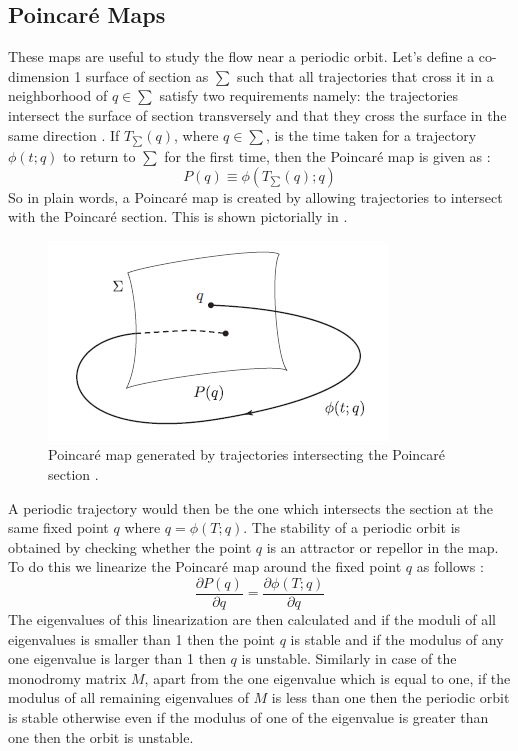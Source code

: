 \subsection{Poincar\'e Maps}
These maps are useful to study the flow near a periodic orbit. Let's define a co-dimension 1 surface of section as $\sum$ such that all trajectories that cross it in a neighborhood of $q\in \sum$ satisfy two requirements namely: the trajectories intersect the surface of section transversely and that they cross the surface in the same direction \cite{invariant}. If $T_{\sum}(q)$, where $q\in \sum$, is the time taken for a trajectory $\phi (t;q)$ to return to $\sum$ for the first time, then the Poincar\'e map is given as \cite{invariant}:
\begin{equation}
P(q) \equiv \phi (T_{\sum} (q); q)
\end{equation}
%
So in plain words, a Poincar\'e map is created by allowing trajectories to intersect with the Poincar\'e section. This is shown pictorially in .
%
\begin{figure}[h]
\centering
\captionsetup{justification=centering}
\includegraphics[scale=0.7]{map.png}
\caption{Poincar\'e map generated by trajectories intersecting the Poincar\'e section \cite{invariant}.}
\label{fig:map}
\end{figure}
\FloatBarrier
%
A periodic trajectory would then be the one which intersects the section at the same fixed point $q$ where $q = \phi(T;q)$. The stability of a periodic orbit is obtained by checking whether the point $q$ is an attractor or repellor in the map. To do this we linearize the Poincar\'e map around the fixed point $q$ as follows \cite{invariant}:
\begin{equation}
\frac{\partial P(q)}{\partial q} = \frac{\partial \phi (T;q)}{\partial q}
\end{equation}
%
The eigenvalues of this linearization are then calculated and if the moduli of all eigenvalues is smaller than 1 then the point $q$ is stable and if the modulus of any one eigenvalue is larger than 1 then $q$ is unstable. Similarly in case of the monodromy matrix $M$, apart from the one eigenvalue which is equal to one, if the modulus of all remaining eigenvalues of $M$ is less than one then the periodic orbit is stable otherwise even if the modulus of one of the eigenvalue is greater than one then the orbit is unstable.

